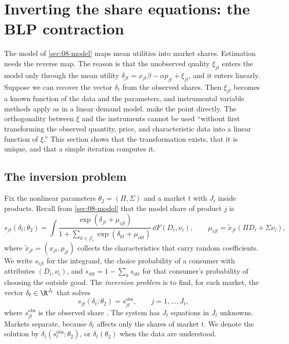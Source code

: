\section{Inverting the share equations: the BLP contraction}\label{sec:08-inversion}

The model of \cref{sec:08-model} maps mean utilities into market shares. Estimation needs the reverse
map. The reason is that the unobserved quality $\xi_{jt}$ enters the model only through the mean utility
$\delta_{jt} = x_{jt}\beta - \alpha p_{jt} + \xi_{jt}$, and it enters linearly. Suppose we can recover the vector
$\delta_t$ from the observed shares. Then $\xi_{jt}$ becomes a known function of the data and the
parameters, and instrumental variable methods apply as in a linear demand model. \citet[pp.~850--851]%
{BerryLevinsohnPakes1995} make the point directly. The orthogonality between $\xi$ and the instruments
cannot be used ``without first transforming the observed quantity, price, and characteristic data into a
linear function of $\xi$.'' This section shows that the transformation exists, that it is unique, and that a
simple iteration computes it.

\subsection{The inversion problem}\label{sec:08-inv-problem}

Fix the nonlinear parameters $\theta_2 = (\Pi, \Sigma)$ and a market $t$ with $J_t$ inside products. Recall
from \cref{sec:08-model} that the model share of product $j$ is
\begin{equation}\label{eq:08-p2-share}
  s_{jt}(\delta_t;\theta_2) = \int \frac{\exp(\delta_{jt} + \mu_{ijt})}{1 + \sum_{k \in \mathcal{J}_t}
  \exp(\delta_{kt} + \mu_{ikt})}\, \dd F(D_i, \nu_i),
  \qquad \mu_{ijt} = \tilde x_{jt}(\Pi D_i + \Sigma\nu_i),
\end{equation}
where $\tilde x_{jt} = (x_{jt}, p_{jt})$ collects the characteristics that carry random coefficients. We
write $s_{ijt}$ for the integrand, the choice probability of a consumer with attributes $(D_i, \nu_i)$, and
$s_{i0t} = 1 - \sum_{k} s_{ikt}$ for that consumer's probability of choosing the outside good. The
\emph{inversion problem} is to find, for each market, the vector $\delta_t \in \R^{J_t}$ that solves
\begin{equation}\label{eq:08-inv-system}
  s_{jt}(\delta_t;\theta_2) = s^{\text{obs}}_{jt}, \qquad j = 1, \dots, J_t,
\end{equation}
where $s^{\text{obs}}_{jt}$ is the observed share \citep[eq.~10]{Nevo2000a}. The system has $J_t$ equations in
$J_t$ unknowns. Markets separate, because $\delta_t$ affects only the shares of market $t$. We denote the
solution by $\delta_t(s^{\text{obs}}_t;\theta_2)$, or $\delta_t(\theta_2)$ when the data are understood.

